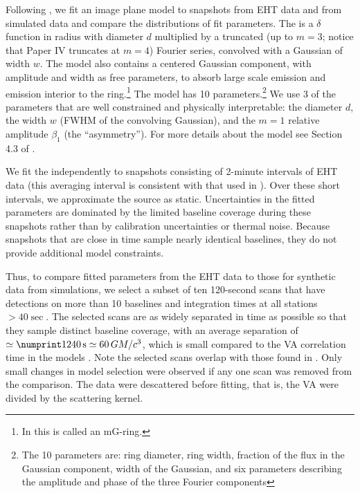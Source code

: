 Following , we fit an \mring image plane model to snapshots from EHT data and from simulated data and compare the distributions of fit parameters.  The \mring is a $\delta$ function in radius with diameter $d$ multiplied by a truncated (up to $m = 3$; notice that Paper IV truncates at $m = 4$) Fourier series, convolved with a Gaussian of width $w$.
The model also contains a centered Gaussian component, with amplitude and width as free parameters, to absorb large scale emission and emission interior to the ring.\footnote{In  this is called an mG-ring.}
The \mring model has 10 parameters.\footnote{The 10 parameters are: ring diameter, ring width, fraction of the flux in the Gaussian component, width of the Gaussian, and six parameters describing the amplitude and phase of the three Fourier components} We use 3 of the parameters that are well constrained and physically interpretable: the \mring diameter $d$,
the \mring width $w$ (FWHM of the convolving Gaussian), and the $m=1$ relative amplitude $\beta_1$ (the ``asymmetry'').  For more details about the \mring model see Section 4.3 of .

We fit the \mring independently to snapshots consisting of 2-minute intervals of EHT data (this averaging interval is consistent with that used in ).
Over these short intervals, we approximate the source as static.
Uncertainties in the fitted \mring parameters are dominated by the limited baseline coverage during these snapshots rather than by calibration uncertainties or thermal noise.
Because snapshots that are close in time sample nearly identical baselines, they do not provide additional model constraints.

Thus, to compare fitted \mring parameters from the EHT data to those for synthetic data from simulations, we select a subset of ten 120-second scans  that have detections on more than 10 baselines and integration times at all stations $> 40\sec$.
The selected scans are as widely separated in time as possible so that they sample distinct baseline coverage, with an average separation of $\simeq \no{1240}\sec \simeq 60 \,\tg$, which is small compared to the VA correlation time in the models \citep{Georgiev_2022}.
Note the selected scans overlap with those found in \citep{BestTime}.
Only small changes in model selection were observed if any one scan was removed from the comparison.
The data were descattered before fitting, that is, the VA were divided by the scattering kernel.

